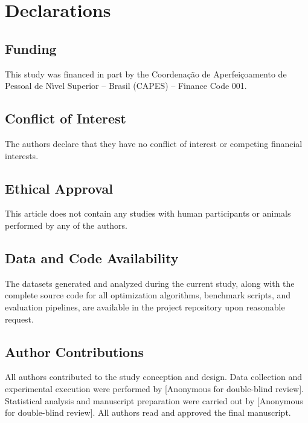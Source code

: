 
\section*{Declarations}

\subsection*{Funding}
This study was financed in part by the Coordena\c{c}\~{a}o de Aperfei\c{c}oamento de Pessoal de N\'{\i}vel Superior -- Brasil (CAPES) -- Finance Code 001.

\subsection*{Conflict of Interest}
The authors declare that they have no conflict of interest or competing financial interests.

\subsection*{Ethical Approval}
This article does not contain any studies with human participants or animals performed by any of the authors.

\subsection*{Data and Code Availability}
The datasets generated and analyzed during the current study, along with the complete source code for all optimization algorithms, benchmark scripts, and evaluation pipelines, are available in the project repository upon reasonable request.

\subsection*{Author Contributions}
All authors contributed to the study conception and design. Data collection and experimental execution were performed by [Anonymous for double-blind review]. Statistical analysis and manuscript preparation were carried out by [Anonymous for double-blind review]. All authors read and approved the final manuscript.
